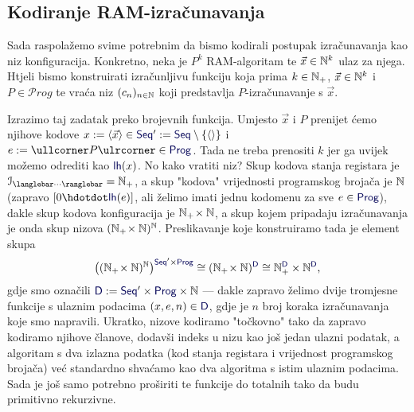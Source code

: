 \subsection{Kodiranje RAM-izračunavanja}

Sada raspolažemo svime potrebnim da bismo kodirali postupak iz\-ra\-ču\-na\-va\-nja kao niz konfiguracija. Konkretno, neka je $P^k$ RAM-algoritam te $\vec x\in{\mathbb N}^k$ ulaz za njega. Htjeli bismo konstruirati izračunljivu funkciju koja prima $k\in{\mathbb N}_+$, $\vec x\in{\mathbb N}^k$ i $P\in\mathscr Prog$ te vraća niz $(c_n)_{n\in{\mathbb N}}$ koji predstavlja $P$-izračunavanje s $\vec x$. 

Izrazimo taj zadatak preko brojevnih funkcija. Umjesto $\vec x$ i $P$ prenijet ćemo njihove kodove $x:=\langle\vec x\rangle\in\f{Seq}':=\f{Seq}\setminus\{\langle\rangle\}$ i $e:=\kprog{P}\in\f{Prog}$. Tada ne treba prenositi $k$ jer ga uvijek možemo odrediti kao $\f{lh}(x)$. No kako vratiti niz? Skup kodova stanja registara je $\im{\knk{\cdots}}=\N_+$, a skup "kodova" vrijednosti programskog brojača je ${\mathbb N}$ (zapravo $[0\dd\f{lh}(e)]$, ali želimo imati jednu kodomenu za sve $e\in\f{Prog}$), dakle skup kodova konfiguracija je ${\mathbb N}_+\!\times{\mathbb N}$, a skup kojem pripadaju izračunavanja je onda skup nizova $({\mathbb N}_+\!\times{\mathbb N})^{\mathbb N}$. Preslikavanje koje konstruiramo tada je element skupa
\begin{equation}
    \bigl((\N_+\!\times\N)^\N\bigr)^{\f{Seq}'\times\f{Prog}}\cong
    (\N_+\!\times\N)^{\f D}\cong\N_+^{\f D}\times\N^{\f D}\text,
\end{equation}
gdje smo označili $\f D:=\f{Seq}'\times\f{Prog}\times\N$ --- dakle zapravo želimo dvije tromjesne funkcije s ulaznim podacima $(x,e,n)\in\f D$, gdje je $n$ broj koraka izračunavanja koje smo napravili. Ukratko, nizove kodiramo "točkovno" tako da zapravo kodiramo njihove članove, dodavši indeks u nizu kao još jedan ulazni podatak, a algoritam s dva izlazna podatka (kod stanja registara i vrijednost programskog brojača) već standardno shvaćamo kao dva algoritma s istim ulaznim podacima. Sada je još samo potrebno proširiti te funkcije do totalnih tako da budu primitivno rekurzivne.

